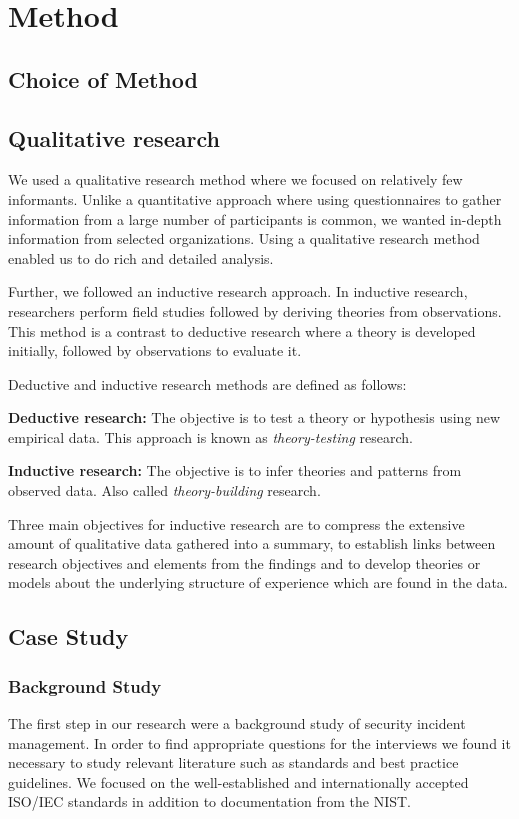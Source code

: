 \chapter{Method}
\section{Choice of Method}


\section{Qualitative research}
We used a qualitative research method where we focused on relatively few informants. Unlike a quantitative approach where using questionnaires to gather information from a large number of participants is common, we wanted in-depth information from selected organizations. Using a qualitative research method enabled us to do rich and detailed analysis. 

Further, we followed an inductive research approach. In inductive research, researchers perform field studies followed by deriving theories from observations. This method is a contrast to deductive research where a theory is developed initially, followed by observations to evaluate it\cite{oates2005researching}. 

Deductive and inductive research methods are defined as follows\cite{bhattacherjee2012social}: 

\textbf{Deductive research:} The objective is to test a theory or hypothesis using new empirical data. This approach is known as \emph{theory-testing} research.

\textbf{Inductive research:} The objective is to infer theories and patterns from observed data. Also called \emph{theory-building} research.

Three main objectives for inductive research are to compress the extensive amount of qualitative data gathered into a summary, to establish links between research objectives and elements from the findings and to develop theories or models about the underlying structure of experience which are found in the data\cite{thomas2006general}. 

\section{Case Study}
\label{sec:caseStudy}


\subsection{Background Study}
\label{sec:background}
The first step in our research were a background study of security incident management. In order to find appropriate questions for the interviews we found it necessary to study relevant literature such as standards and best practice guidelines. We focused on the well-established and internationally accepted ISO/IEC standards in addition to documentation from the \ac{NIST}.

